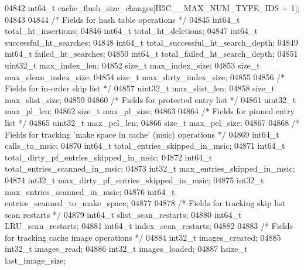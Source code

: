 \begin{DoxyCode}
04842     int64\_t                     cache\_flush\_size\_changes[H5C\_\_MAX\_NUM\_TYPE\_IDS + 1];
04843 
04844     \textcolor{comment}{/* Fields for hash table operations */}
04845     int64\_t         total\_ht\_insertions;
04846     int64\_t         total\_ht\_deletions;
04847     int64\_t         successful\_ht\_searches;
04848     int64\_t         total\_successful\_ht\_search\_depth;
04849     int64\_t         failed\_ht\_searches;
04850     int64\_t         total\_failed\_ht\_search\_depth;
04851     uint32\_t                    max\_index\_len;
04852     \textcolor{keywordtype}{size\_t}                      max\_index\_size;
04853     \textcolor{keywordtype}{size\_t}                      max\_clean\_index\_size;
04854     \textcolor{keywordtype}{size\_t}                      max\_dirty\_index\_size;
04855 
04856     \textcolor{comment}{/* Fields for in-order skip list */}
04857     uint32\_t                    max\_slist\_len;
04858     \textcolor{keywordtype}{size\_t}                      max\_slist\_size;
04859 
04860     \textcolor{comment}{/* Fields for protected entry list */}
04861     uint32\_t                    max\_pl\_len;
04862     \textcolor{keywordtype}{size\_t}                      max\_pl\_size;
04863 
04864     \textcolor{comment}{/* Fields for pinned entry list */}
04865     uint32\_t                    max\_pel\_len;
04866     \textcolor{keywordtype}{size\_t}                      max\_pel\_size;
04867 
04868     \textcolor{comment}{/* Fields for tracking 'make space in cache' (msic) operations */}
04869     int64\_t                     calls\_to\_msic;
04870     int64\_t                     total\_entries\_skipped\_in\_msic;
04871     int64\_t                     total\_dirty\_pf\_entries\_skipped\_in\_msic;
04872     int64\_t                     total\_entries\_scanned\_in\_msic;
04873     int32\_t                     max\_entries\_skipped\_in\_msic;
04874     int32\_t                     max\_dirty\_pf\_entries\_skipped\_in\_msic;
04875     int32\_t                     max\_entries\_scanned\_in\_msic;
04876     int64\_t                     entries\_scanned\_to\_make\_space;
04877  
04878     \textcolor{comment}{/* Fields for tracking skip list scan restarts */}
04879     int64\_t         slist\_scan\_restarts;
04880     int64\_t         LRU\_scan\_restarts;
04881     int64\_t         index\_scan\_restarts;
04882 
04883     \textcolor{comment}{/* Fields for tracking cache image operations */}
04884     int32\_t         images\_created;
04885     int32\_t         images\_read;
04886     int32\_t         images\_loaded;
04887     hsize\_t         last\_image\_size;

\end{DoxyCode}
